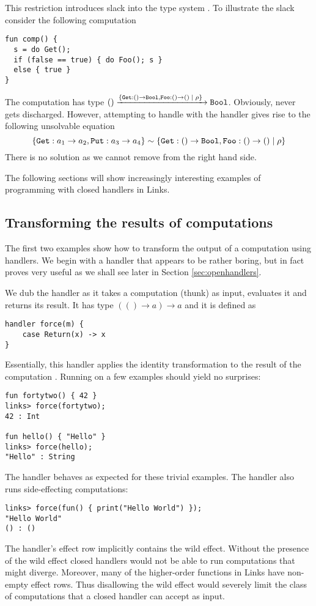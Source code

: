 This restriction introduces slack into the type system \cite{Huttel2010}. To illustrate the slack consider the following computation
\begin{lstlisting}[style=links]
fun comp() {
  s = do Get();
  if (false == true) { do Foo(); s }
  else { true }
}
\end{lstlisting}
The computation  has type $() \xrightarrow{ \{ \texttt{Get}:() \to \texttt{Bool},\texttt{Foo}:() \to () \; | \; \rho \}\;} \texttt{Bool}$. Obviously,  never gets discharged. However, attempting to handle  with the handler  gives rise to the following unsolvable equation 
\[ \{\texttt{Get}: a_1 \to a_2, \texttt{Put} : a_3 \to a_4 \} \sim \{\texttt{Get}:() \to \texttt{Bool},\texttt{Foo}:() \to () \; | \; \rho \}\]
There is no solution as we cannot remove  from the right hand side.

The following sections will show increasingly interesting examples of programming with closed handlers in Links.

\subsection{Transforming the results of computations}\label{sec:transform}
The first two examples show how to transform the output of a computation using handlers. We begin with a handler that appears to be rather boring, but in fact proves very useful as we shall see later in Section \ref{sec:openhandlers}.
\begin{example}\label{ex:force}
We dub the handler  as it takes a computation (thunk) as input, evaluates it and returns its result. It has type $(() \to a) \to a$ and it is defined as
\begin{lstlisting}[style=links]
handler force(m) {
    case Return(x) -> x
}
\end{lstlisting}
Essentially, this handler applies the identity transformation to the result of the computation . Running  on a few examples should yield no surprises:
\begin{lstlisting}[style=links]
fun fortytwo() { 42 }
links> force(fortytwo);
42 : Int

fun hello() { "Hello" }
links> force(hello);
"Hello" : String
\end{lstlisting}
The handler  behaves as expected for these trivial examples. The  handler also runs side-effecting computations:
\begin{lstlisting}[style=links]
links> force(fun() { print("Hello World") });
"Hello World"
() : ()
\end{lstlisting}
The  handler's effect row implicitly contains the wild effect. Without the presence of the wild effect closed handlers would not be able to run computations that might diverge. Moreover, many of the higher-order functions in Links have non-empty effect rows. Thus disallowing the wild effect would severely limit the class of computations that a closed handler can accept as input.
\end{example}

